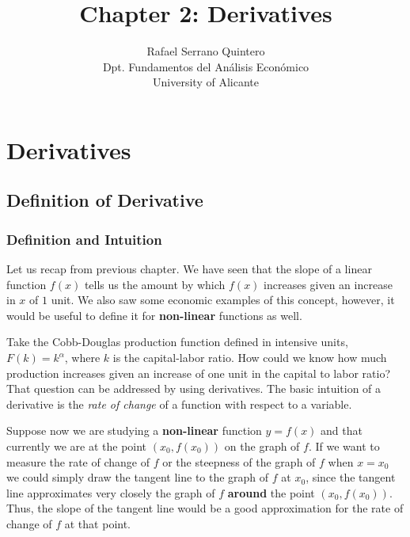 \documentclass[11pt]{article}
\title{Chapter 2: Derivatives}
\author{Rafael Serrano Quintero \\
    Dpt. Fundamentos del An\'alisis Econ\'omico \\
    University of Alicante}
\date{}
\theoremstyle{definition}
\theoremstyle{plain}
\begin{document}
    
    
    \maketitle
    
    

\section{Derivatives}\label{derivatives}

\subsection{Definition of Derivative}\label{definition-of-derivative}

\subsubsection{Definition and Intuition}\label{definition-and-intuition}

Let us recap from previous chapter. We have seen that the slope of a
linear function \(f(x)\) tells us the amount by which \(f(x)\) increases
given an increase in \(x\) of \(1\) unit. We also saw some economic
examples of this concept, however, it would be useful to define it for
\textbf{non-linear} functions as well.

Take the Cobb-Douglas production function defined in intensive units,
\(F(k) = k^{\alpha}\), where \(k\) is the capital-labor ratio. How could
we know how much production increases given an increase of one unit in
the capital to labor ratio? That question can be addressed by using
derivatives. The basic intuition of a derivative is the \emph{rate of
change} of a function with respect to a variable.

Suppose now we are studying a \textbf{non-linear} function \(y = f(x)\)
and that currently we are at the point \(\left(x_0, f(x_0)\right)\) on
the graph of \(f\). If we want to measure the rate of change of \(f\) or
the steepness of the graph of \(f\) when \(x = x_0\) we could simply
draw the tangent line to the graph of \(f\) at \(x_0\), since the
tangent line approximates very closely the graph of \(f\)
\textbf{around} the point \(\left(x_0, f(x_0)\right)\). Thus, the slope
of the tangent line would be a good approximation for the rate of change
of \(f\) at that point.

    \begin{center}
    \end{center}
    { \hspace*{\fill} \\}
    
\end{document}
